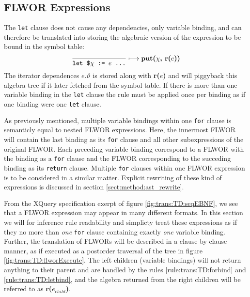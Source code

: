 \subsection{FLWOR Expressions}
\label{sect:trans:TD:simpleFLWOR}
The \texttt{let} clause does not cause any dependencies, only variable binding, and can therefore be translated
into storing the algebraic version of the expression to be bound in the symbol table:
\begin{equation}
\frac{}{\mbox{\texttt{let \$}}\chi \mbox{\texttt{ := }}e \mbox{\texttt{ \ldots}}}\longmapsto
\mbox{\textbf{put(}}\chi\mbox{\textbf{, r(}}e\mbox{\textbf{))}}
\label{rule:trans:TD:letbind}
\end{equation}
The iterator dependences $e.\vartheta$ is stored along with \textbf{r(}$e$\textbf{)} and will piggyback this
algebra tree if it later fetched from the symbol table. If there is more than one variable binding in the
\texttt{let} clause the rule must be applied once per binding as if one binding were one \texttt{let} clause.

As previously mentioned, multiple variable bindings within one \texttt{for} clause is semanticly equal to
nested FLWOR expressions. Here, the innermost FLWOR will contain the last binding as its \texttt{for} clause and
all other subexpressions of the original FLWOR. Each preceding variable binding correspond to a FLWOR with the
binding as a \texttt{for} clause and the FLWOR corresponding to the succeding binding as its \texttt{return}
clause. Multiple \texttt{for} clauses within one FLWOR expression is to be considered in a similar matter.
Explicit rewriting of these kind of expressions is discussed in section \ref{sect:method:ast_rewrite}.

From the XQuery specification exerpt of figure \ref{fig:trans:TD:seqEBNF}, we see that a FLWOR expression may
appear in many different formats. In this section we will for inference rule readability and simplicty treat these
expressions as if they no more than \emph{one} \texttt{for} clause containing exactly \emph{one} variable binding.
Further, the translation of FLWORs will be described in a clause-by-clause manner, as if executed as a postorder
traversal of the tree in figure \ref{fig:trans:TD:flworExecute}. The left children (variable bindings) will not
return anything to their parent and are handled by the rules \ref{rule:trans:TD:forbind} and
\ref{rule:trans:TD:letbind}, and the algebra returned from the right children will be referred to as
\textbf{r(}$e_{child}$\textbf{)}.

